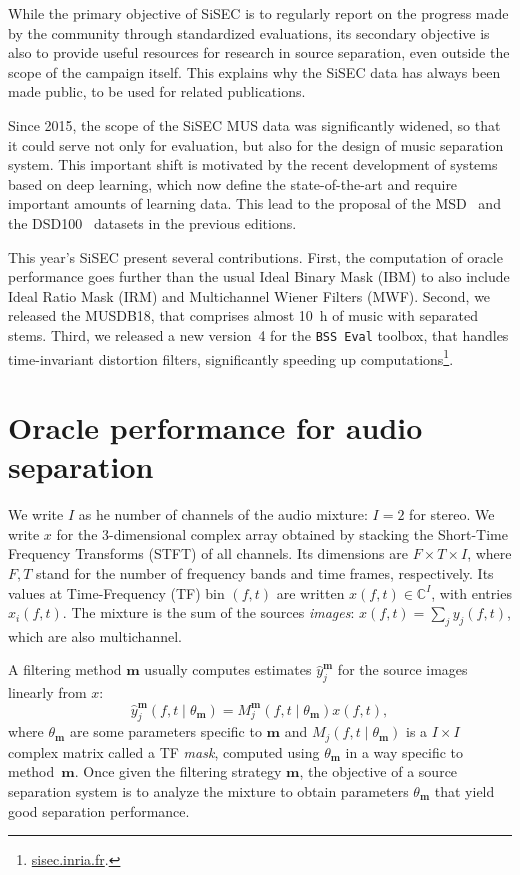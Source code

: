 \documentclass{article}
\newcommand{\sboxed}[1]{\textbf{#1}}
\newcommand{\thet}[1]{\theta_{\sboxed{#1}}}
\newcommand{\ft}{\left(f,t\right)}
\newcommand{\ftt}[1]{\left(f,t\mid\thet{#1}\right)}
\begin{document}
While the primary objective of SiSEC is to regularly report on the progress made by the community through standardized evaluations, its secondary objective is also to provide useful resources for research in source separation, even outside the scope of the campaign itself. This explains why the SiSEC data has always been made public, to be used for related publications.

Since 2015, the scope of the SiSEC MUS data was significantly widened, so that it could serve not only for evaluation, but also for the design of music separation system. This important shift is motivated by the recent development of systems based on deep learning, which now define the state-of-the-art and require important amounts of learning data. This lead to the proposal of the MSD~\cite{sisec2015} and the DSD100~\cite{sisec2016} datasets in the previous editions.%

This year's SiSEC present several contributions. First, the computation of oracle performance goes further than the usual Ideal Binary Mask (IBM) to also include Ideal Ratio Mask (IRM) and Multichannel Wiener Filters (MWF). Second, we released the MUSDB18, that comprises almost 10~h of music with separated stems. Third, we released a new version~4 for the \texttt{BSS~Eval} toolbox, that handles time-invariant distortion filters, significantly speeding up computations\footnote{\url{sisec.inria.fr}.}.

\section{Oracle performance for audio separation}
\label{sec:oracle}

We write $I$ as he number of channels of the audio mixture: $I=2$ for stereo. We write $x$ for the 3-dimensional complex array obtained by stacking the Short-Time Frequency Transforms (STFT) of all channels. Its dimensions are $F\times T\times I$, where $F,T$ stand for the number of frequency bands and time frames, respectively. Its values at Time-Frequency (TF) bin $\ft$ are  written $x\ft\in\mathbb{C}^I$, with entries $x_i\ft$. The mixture is the sum of the sources \textit{images}: $x\ft=\sum_j y_j\ft$, which are also multichannel.

A filtering method $\sboxed{m}$ usually computes estimates $\hat{y}_j^{\sboxed{m}}$ for the source images linearly from $x$:
\begin{equation}
  \hat{y}_j^{\sboxed{m}}\ftt{m}=M_j^{\sboxed{m}}\ftt{m} x\ft,\label{eq:TFmask}
\end{equation}
where $\thet{m}$ are some parameters specific to $\sboxed{m}$ and $M_j\ftt{m}$ is a $I\times I$ complex matrix called a TF \textit{mask}, computed using $\thet{m}$ in a way specific to method~$\sboxed{m}$. Once given the filtering strategy $\sboxed{m}$, the objective of a source separation system is to analyze the mixture to obtain parameters $\thet{m}$ that yield good separation performance.
\end{document}
